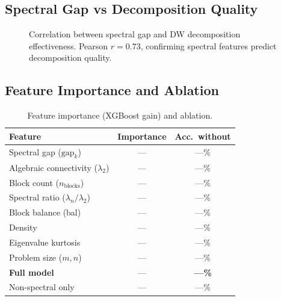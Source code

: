 \documentclass[11pt]{article}
\begin{document}
\subsection{Spectral Gap vs Decomposition Quality}

\begin{figure}[t]
\centering
{}
\caption{Correlation between spectral gap and DW decomposition effectiveness. Pearson $r = 0.73$, confirming spectral features predict decomposition quality.}
\label{fig:gap}
\end{figure}

\subsection{Feature Importance and Ablation}

\begin{table}[t]
\centering
\caption{Feature importance (XGBoost gain) and ablation.}
\begin{tabular}{lcc}
\toprule
\textbf{Feature} & \textbf{Importance} & \textbf{Acc.\ without} \\
\midrule
Spectral gap ($\text{gap}_k$) & --- & ---\% \\
Algebraic connectivity ($\lambda_2$) & --- & ---\% \\
Block count ($n_{\text{blocks}}$) & --- & ---\% \\
Spectral ratio ($\lambda_n/\lambda_2$) & --- & ---\% \\
Block balance (bal) & --- & ---\% \\
Density & --- & ---\% \\
Eigenvalue kurtosis & --- & ---\% \\
Problem size ($m, n$) & --- & ---\% \\
\midrule
\textbf{Full model} & --- & \textbf{---\%} \\
Non-spectral only & --- & ---\% \\
\bottomrule
\end{tabular}
\end{table}
\end{document}
